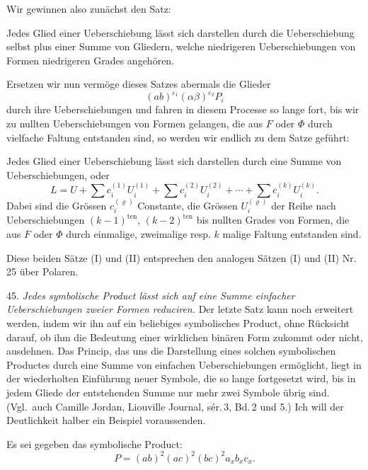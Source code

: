 \documentclass[11pt]{article}
\providecommand{\weq}[2]{\begin{equation}\tag{#1}#2\end{equation}}
\let\Phi\varPhi
\begin{document}
Wir gewinnen also zunächst den Satz:

\glqq Jedes Glied einer Ueberschiebung lässt sich darstellen durch die
Ueberschiebung selbst plus einer Summe von Gliedern, welche niedrigeren
Ueberschiebungen von Formen niedrigeren Grades angehören.\grqq{}

Ersetzen wir nun vermöge dieses Satzes abermals die Glieder
\[
(ab)^{\varepsilon_1}(\alpha\beta)^{\varepsilon_2}P_i
\]
durch ihre Ueberschiebungen und fahren in diesem Processe so lange fort, bis
wir zu nullten Ueberschiebungen von Formen gelangen, die aus $F$ oder $\Phi$
durch vielfache Faltung entstanden sind, so werden wir endlich zu dem Satze
geführt:

\glqq Jedes Glied einer Ueberschiebung lässt sich darstellen durch eine
Summe von Ueberschiebungen,\grqq{} oder
\weq{II}{L=U+\sum c_i^{(1)}U_i^{(1)}+\sum c_i^{(2)}U_i^{(2)}+\cdots+\sum c_i^{(k)}U_i^{(k)}.}
Dabei sind die Grössen $c_i^{(\varrho)}$ Constante, die Grössen
$U_i^{(\varrho)}$ der Reihe nach Ueberschiebungen $(k-1)^{\mathrm{ten}}$,
$(k-2)^{\mathrm{ten}}$ bis nullten Grades von Formen, die aus $F$ oder
$\Phi$ durch einmalige, zweimalige resp. $k$ malige Faltung entstanden sind.

Diese beiden Sätze (I) und (II) entsprechen den analogen Sätzen (I) und (II)
Nr.\,25 über Polaren.

45. \textit{Jedes symbolische Product lässt sich auf eine Summe einfacher
Ueberschiebungen zweier Formen reduciren.} Der letzte Satz kann noch
erweitert werden, indem wir ihn auf ein beliebiges symbolisches Product,
ohne Rücksicht darauf, ob ihm die Bedeutung einer wirklichen binären Form
zukommt oder nicht, ausdehnen. Das Princip, das uns die Darstellung eines
solchen symbolischen Productes durch eine Summe von einfachen
Ueberschiebungen ermöglicht, liegt in der wiederholten Einführung neuer
Symbole, die so lange fortgesetzt wird, bis in jedem Gliede der
entstehenden Summe nur mehr zwei Symbole übrig sind. (Vgl.\ auch Camille
Jordan, Liouville Journal, sér.\,3, Bd.\,2 und 5.) Ich will der
Deutlichkeit halber ein Beispiel voraussenden.

Es sei gegeben das symbolische Product:
\[
P=(ab)^2(ac)^2(bc)^2 a_x b_x c_x.
\]
\end{document}
